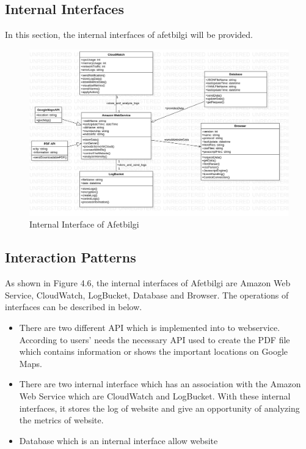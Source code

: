 \subsection{Internal Interfaces}

In this section, the internal interfaces of afetbilgi will be provided. \\

\begin{figure}[H]
    \includegraphics[scale = 0.4]{assets/InternalInterfaces.png}
    \caption[Internal Interface of Afetbilgi]{Internal Interface of Afetbilgi}
\end{figure}

\subsection{Interaction Patterns}

As shown in Figure 4.6, the internal interfaces of Afetbilgi are Amazon Web Service, CloudWatch, LogBucket, Database and Browser. The operations of interfaces can be described in below. \\

\begin{itemize}
    \item There are two different API which is implemented into to webservice. According to users' needs the necessary API used to create the PDF file which contains information or shows the important locations on Google Maps.
    \item There are two internal interface which has an association with the Amazon Web Service which are CloudWatch and LogBucket. With these internal interfaces, it stores the log of website and give an opportunity of analyzing the metrics of website.
    \item Database which is an internal interface allow website 
\end{itemize}

